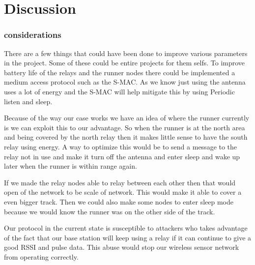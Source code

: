\chapter{Discussion}
\subsection{considerations}
There are a few things that could have been done to improve various parameters in the project. Some of these could be entire projects for them selfs.
To improve battery life of the relays and the runner nodes there could be implemented a medium access protocol such as the S-MAC. As we know just using the antenna uses a lot of energy and the S-MAC will help mitigate this by using Periodic listen and sleep.

Because of the way our case works we have an idea of where the runner currently is we can exploit this to our advantage. So when the runner is at the north area and being covered by the north relay then it makes little sense to have the south relay using energy. A way to optimize this would be to send a message to the relay not in use and make it turn off the antenna and enter sleep and wake up later when the runner is within range again.   

If we made the relay nodes able to relay between each other then that would open of the network to be scale of network. This would make it able to cover a even bigger track. Then we could also make some nodes to enter sleep mode because we would know the runner was on the other side of the track.

Our protocol in the current state is susceptible to attackers who takes advantage of the fact that our base station will keep using a relay if it can continue to give a good RSSI and pulse data. This abuse would stop our wireless sensor network from operating correctly.